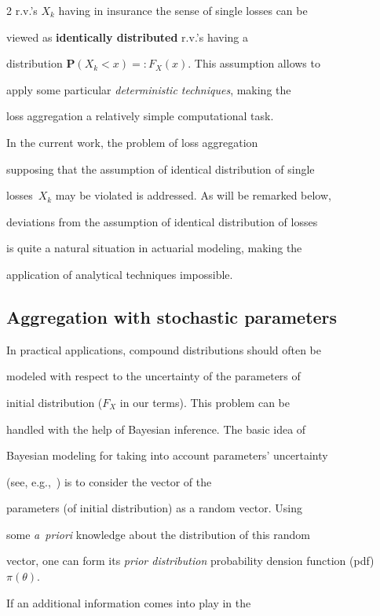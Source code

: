 \begin{multicols}{2}
r.v.'s $X_k$ having in insurance the sense of single losses can be

viewed as {\bf identically distributed} r.v.'s having a

distribution $\mathbf{P}(X_k<x)=:F_X(x)$. This assumption allows to

apply some particular {\it deterministic techniques}, making the

loss aggregation a relatively simple computational task.



In the current work, the problem of loss aggregation

supposing that the assumption of identical distribution of single

losses~$X_k$ may be violated is addressed. As will be remarked below,

deviations from the assumption of identical distribution of losses

is quite a natural situation in actuarial modeling, making the

application of analytical techniques impossible.



\subsection{Aggregation with stochastic parameters}



\noindent

In practical applications, compound distributions should often be

modeled with respect to the uncertainty of the parameters of

initial distribution ($F_X$ in our terms). This problem can be

handled with the help of Bayesian inference. The basic idea of

Bayesian modeling for taking into account parameters' uncertainty

(see, e.g.,~\cite{Shev4}) is to consider the vector of the

parameters (of initial distribution) as a random vector. Using

some \textit{a~priori} knowledge about the distribution of this random

vector, one can form its {\it prior distribution} probability dension function (pdf)~$\pi(\theta)$.

If an additional information comes into play in the


\end{multicols}
